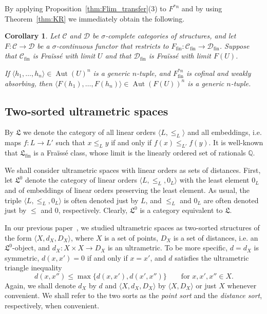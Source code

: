 \documentclass[10pt,a4paper]{article}
\newtheorem{wn}[tw]{Corollary}
\theoremstyle{definition}
\theoremstyle{remark}
\newcommand \set [1]{\{#1\}}
\newcommand \seq [1]{\langle #1 \rangle}
\newcommand \map [3]{#1\colon #2 \to #3} %
\newcommand \maps {\colon} %
\newcommand \Q {\mathbb{Q}}
\newcommand \C {\mathscr{C}}
\newcommand \D {\mathscr{D}}
\newcommand \fin {{\operatorname{fin}}}
\newcommand \Lin {\mathfrak{L}}
\newcommand \Aut {\operatorname{Aut}}
\begin{document}
By applying Proposition~\ref{thm:Flim_transfer}(3) to $F^{*n}$ and by using Theorem~\ref{thm:KR} we immediately obtain the following.

\begin{wn} \label{thm:generic_transfer}
    Let $\C$ and $\D$ be $\sigma$-complete categories of structures, and let $F\maps \C \to \D$ be a $\sigma$-continuous functor that restricts to $F_\fin\maps \C_\fin \to \D_\fin$.
    Suppose that $\C_\fin$ is Fraïssé with limit $U$ and that $\D_\fin$ is Fraïssé with limit $F(U)$.
    
    If $\seq{h_1, \ldots, h_n} \in \Aut(U)^n$ is a generic $n$-tuple, and $F^{*n}_\fin$ is cofinal and weakly absorbing, then $\seq{F(h_1), \ldots, F(h_n)} \in \Aut(F(U))^n$ is a generic $n$-tuple.
\end{wn}




\subsection{Two-sorted ultrametric spaces}\label{prel:2sort}

By $\Lin$ we denote the category of all linear orders $\seq{L, \leq_L}$ and all embeddings, i.e. maps $f\maps L \to L'$ such that $x \leq_L y$ if and only if $f(x) \leq_{L'} f(y)$.
It is well-known that $\Lin_\fin$ is a Fraïssé class, whose limit is the linearly ordered set of rationals $\Q$.

We shall consider ultrametric spaces with linear orders as sets of distances.
First, let $\Lin^0$ denote the category of linear orders $\seq{L, \leq_L, 0_L}$ with the least element $0_L$ and of embeddings of linear orders preserving the least element.
As usual, the triple $\seq{L, \leq_L, 0_L}$ is often denoted just by $L$, and $\leq_L$ and $0_L$ are often denoted just by $\leq$ and $0$, respectively.
Clearly, $\Lin^0$ is a category equivalent to $\Lin$.

In our previous paper~\cite{paper1}, we studied ultrametric spaces as two-sorted structures of the form $\seq{X, d_X, D_X}$,
where $X$ is a set of points, $D_X$ is a set of distances, i.e. an $\Lin^0$-object, and $\map{d_X}{X \times X}{D_X}$ is an ultrametric.
To be more specific, $d = d_X$ is symmetric, $d(x, x') = 0$ if and only if $x = x'$, and $d$ satisfies the ultrametric triangle inequality 
\[
    d(x, x'') \leq \max\set{d(x,x'), d(x',x'')} \qquad \text{for $x,x',x'' \in X$.}
\]
Again, we shall denote $d_X$ by $d$ and $\seq{X, d_X, D_X}$ by $\seq{X, D_X}$ or just $X$ whenever convenient.
We shall refer to the two sorts as the \emph{point sort} and the \emph{distance sort}, respectively, when convenient.
\end{document}
